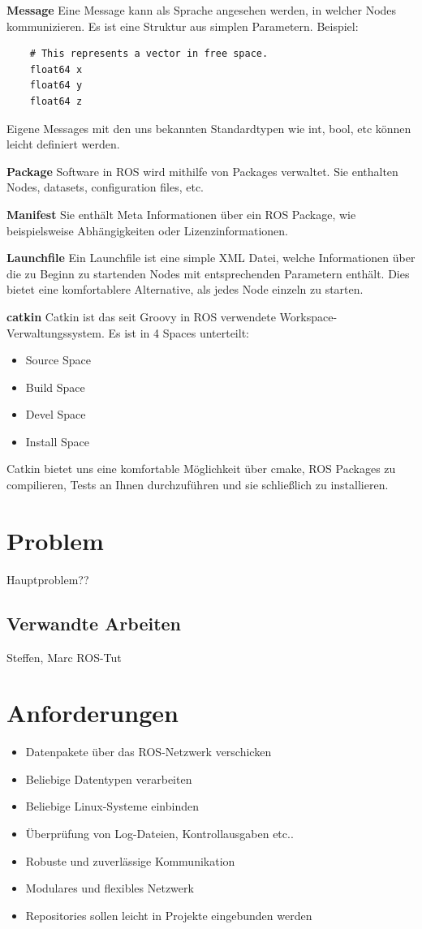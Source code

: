 \documentclass[12pt]{article}
\begin{document}
{\bf Message} Eine Message kann als Sprache angesehen werden, in welcher Nodes kommunizieren. Es ist eine Struktur aus simplen Parametern.
Beispiel:
\begin{verbatim}
	# This represents a vector in free space. 
	float64 x
	float64 y
	float64 z
\end{verbatim}
Eigene Messages mit den uns bekannten Standardtypen wie int, bool, etc können leicht definiert werden.

{\bf Package} Software in ROS wird mithilfe von Packages verwaltet.
Sie enthalten Nodes, datasets, configuration files, etc.

{\bf Manifest} Sie enthält Meta Informationen über ein ROS Package, wie beispielsweise Abhängigkeiten oder Lizenzinformationen.

{\bf Launchfile} Ein Launchfile ist eine simple XML Datei, welche Informationen über die zu Beginn zu startenden Nodes mit entsprechenden Parametern enthält.
Dies bietet eine komfortablere Alternative, als jedes Node einzeln zu starten.
 
{\bf catkin} Catkin ist das seit Groovy in ROS verwendete Workspace-Verwaltungssystem.
Es ist in 4 Spaces unterteilt:
\begin{itemize}
\item Source Space
\item Build Space
\item Devel Space
\item Install Space
\end{itemize}
Catkin bietet uns eine komfortable Möglichkeit über cmake, ROS Packages zu compilieren, Tests an Ihnen durchzuführen und sie schließlich zu installieren.

\section{Problem}

Hauptproblem??

\subsection{Verwandte Arbeiten}

Steffen, Marc
ROS-Tut

\section{Anforderungen}

\begin{itemize}
\item Datenpakete über das ROS-Netzwerk verschicken
\item Beliebige Datentypen verarbeiten
\item Beliebige Linux-Systeme einbinden
\item Überprüfung von Log-Dateien, Kontrollausgaben etc..
\item Robuste und zuverlässige Kommunikation
\item Modulares und flexibles Netzwerk
\item Repositories sollen leicht in Projekte eingebunden werden
\end{itemize}
\end{document}
